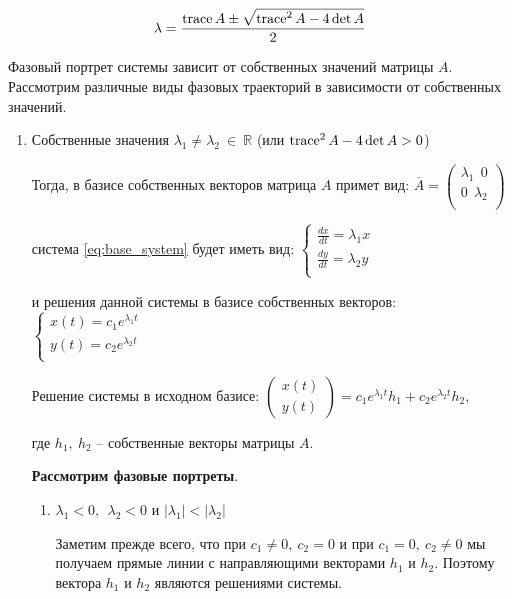 \[ \lambda = \frac{\operatorname{trace} A \pm \sqrt{\operatorname{trace}^2 A - 4 \det A}}{2} \]

Фазовый портрет системы зависит от собственных значений матрицы $A$. Рассмотрим различные виды фазовых траекторий в зависимости от собственных значений.

\begin{enumerate}
  \item Собственные значения  $\lambda_1 \neq \lambda_2 ~ \in ~ \mathbb{R}$ (или $\operatorname{trace}^2 A - 4 \det A > 0$)
  
  Тогда, в базисе собственных векторов матрица $A$ примет вид:
  $\overline{A} = 
  \begin{pmatrix}
    \lambda_1 ~~ 0 \\
    0 ~~ \lambda_2 \\
  \end{pmatrix}$

  система \eqref{eq:base_system} будет иметь вид:
  $\begin{cases}
    \frac{d x}{d t} = \lambda_1 x \\
    \frac{d y}{d t} = \lambda_2 y \\        
  \end{cases}$

  и решения данной системы в базисе собственных векторов:
  $\begin{cases}
    x(t) = c_1 e^{\lambda_1 t} \\
    y(t) = c_2 e^{\lambda_2 t} \\
  \end{cases}$

  Решение системы в исходном базисе:
  $
   \begin{pmatrix}
     x(t) \\
     y(t)
   \end{pmatrix} 
   = c_1 e^{\lambda_1 t} h_1 + c_2 e^{\lambda_2 t} h_2
  $,

  где $h_1, ~ h_2$ -- собственные векторы матрицы $A$.
  
  \textbf{Рассмотрим фазовые портреты}.
  
  \begin{enumerate}
  	\item $\lambda_1 < 0, ~~ \lambda_2 < 0$ и $|\lambda_1| < |\lambda_2|$
  	
  	Заметим прежде всего, что при $c_1 \neq 0, ~ c_2 = 0$ и при $c_1 = 0, ~ c_2 \neq 0$ мы получаем прямые линии с направляющими векторами $h_1$ и $h_2$. Поэтому вектора $h_1$ и $h_2$ являются решениями системы.
  	

\end{enumerate}
\end{enumerate}

